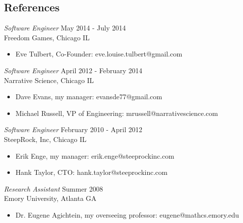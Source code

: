 \documentclass[line,margin]{res}
\begin{document}
\address{waltaskew@gmail.com}
\address{404-819-9796}

\begin{resume}
 
\section{References}
        {\sl Software Engineer} \hfill May 2014 - July 2014 \\
        Freedom Games, Chicago IL
        \begin{itemize}
          \item Eve Tulbert, Co-Founder: eve.louise.tulbert@gmail.com
        \end{itemize}
        {\sl Software Engineer} \hfill April 2012 - February 2014 \\
        Narrative Science, Chicago IL
        \begin{itemize} 
          \item Dave Evans, my manager: evansde77@gmail.com
          \item Michael Russell, VP of Engineering: mrussell@narrativescience.com
        \end{itemize}

        {\sl Software Engineer} \hfill February 2010 - April 2012 \\
        SteepRock, Inc, Chicago IL
        \begin{itemize}
          \item Erik Enge, my manager: erik.enge@steeprockinc.com
          \item Hank Taylor, CTO: hank.taylor@steeprockinc.com
        \end{itemize}

        {\sl Research Assistant} \hfill Summer 2008 \\
        Emory University, Atlanta GA
        \begin{itemize}
          \item Dr. Eugene Agichtein, my overseeing professor: eugene@mathcs.emory.edu
        \end{itemize}

\end{resume}
\end{document}
